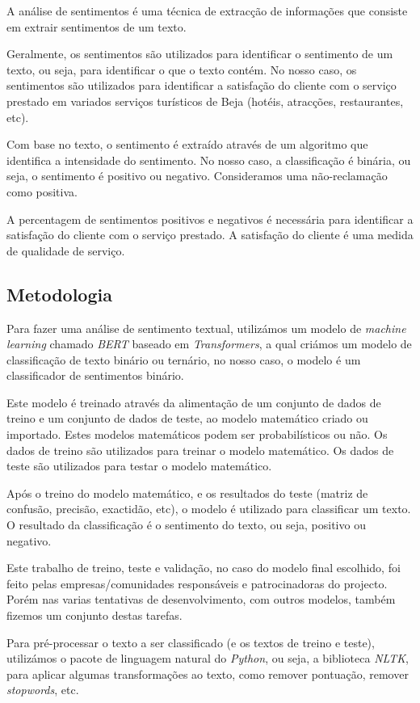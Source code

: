 A análise de sentimentos é uma técnica de extracção de informações que consiste em extrair sentimentos de um texto.

Geralmente, os sentimentos são utilizados para identificar o sentimento de um texto, ou seja, para identificar o que o texto contém. No nosso caso, os sentimentos são utilizados para identificar a satisfação do cliente com o serviço prestado em variados serviços turísticos de Beja (hotéis, atracções, restaurantes, etc).

Com base no texto, o sentimento é extraído através de um algoritmo que identifica a intensidade do sentimento. No nosso caso, a classificação é binária, ou seja, o sentimento é positivo ou negativo. Consideramos uma não-reclamação como positiva.

A percentagem de sentimentos positivos e negativos é necessária para identificar a satisfação do cliente com o serviço prestado. A satisfação do cliente é uma medida de qualidade de serviço.

\subsection{Metodologia}

Para fazer uma análise de sentimento textual, utilizámos um modelo de \textit{machine learning} chamado \textit{BERT} baseado em \textit{Transformers}, a qual criámos um modelo de classificação de texto binário ou ternário, no nosso caso, o modelo é um classificador de sentimentos binário.

Este modelo é treinado através da alimentação de um conjunto de dados de treino e um conjunto de dados de teste, ao modelo matemático criado ou importado. Estes modelos matemáticos podem ser probabilísticos ou não. Os dados de treino são utilizados para treinar o modelo matemático. Os dados de teste são utilizados para testar o modelo matemático.

Após o treino do modelo matemático, e os resultados do teste (matriz de confusão, precisão, exactidão, etc), o modelo é utilizado para classificar um texto. O resultado da classificação é o sentimento do texto, ou seja, positivo ou negativo.

Este trabalho de treino, teste e validação, no caso do modelo final escolhido, foi feito pelas empresas/comunidades responsáveis e patrocinadoras do projecto. Porém nas varias tentativas de desenvolvimento, com outros modelos, também fizemos um conjunto destas tarefas.

Para pré-processar o texto a ser classificado (e os textos de treino e teste), utilizámos o pacote de linguagem natural do \textit{Python}, ou seja, a biblioteca \textit{NLTK}, para aplicar algumas transformações ao texto, como remover pontuação, remover \textit{stopwords}, etc.

